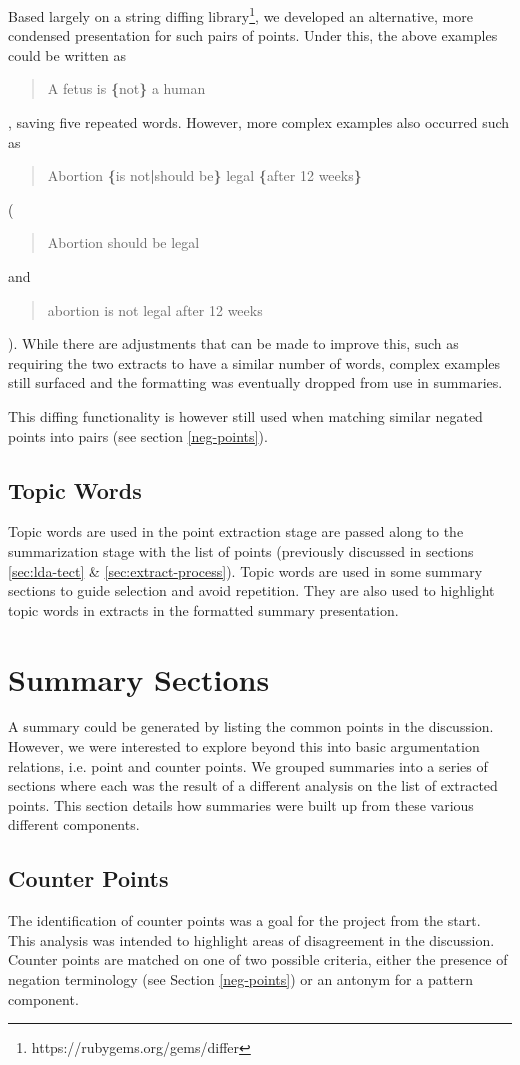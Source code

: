       Based largely on a string diffing library\footnote{https://rubygems.org/gems/differ}, we developed an alternative, more condensed presentation for such pairs of points. Under this, the above examples could be written as \blockquote{A fetus is \textbf{\{}not\textbf{\}} a human}, saving five repeated words. However, more complex examples also occurred such as \blockquote{Abortion \textbf{\{}is not\textbf{|}should be\textbf{\}} legal \textbf{\{}after 12 weeks\textbf{\}}} (\blockquote{Abortion should be legal} and \blockquote{abortion is not legal after 12 weeks}). While there are adjustments that can be made to improve this, such as requiring the two extracts to have a similar number of words, complex examples still surfaced and the formatting was eventually dropped from use in summaries.

      This diffing functionality is however still used when matching similar negated points into pairs (see section \ref{neg-points}).

  \tocless\subsection{Topic Words}
  Topic words are used in the point extraction stage are passed along to the summarization stage with the list of points (previously discussed in sections \ref{sec:lda-tect} \& \ref{sec:extract-process}). Topic words are used in some summary sections to guide selection and avoid repetition. They are also used to highlight topic words in extracts in the formatted summary presentation.

  \section{Summary Sections}
    A summary could be generated by listing the common points in the discussion. However, we were interested to explore beyond this into basic argumentation relations, i.e. point and counter points. We grouped summaries into a series of sections where each was the result of a different analysis on the list of extracted points. This section details how summaries were built up from these various different components.

    \subsection{Counter Points}
      The identification of counter points was a goal for the project from the start. This analysis was intended to highlight areas of disagreement in the discussion. Counter points are matched on one of two possible criteria, either the presence of negation terminology (see Section \ref{neg-points}) or an antonym for a pattern component.

